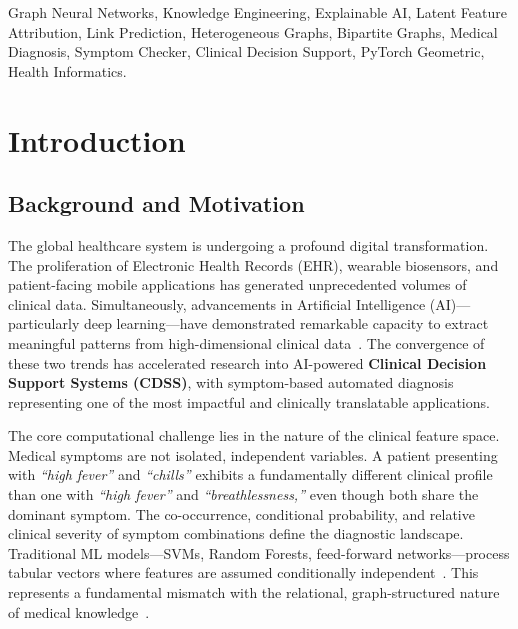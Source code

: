 \documentclass[conference]{IEEEtran}
\begin{document}
\begin{IEEEkeywords}
Graph Neural Networks, Knowledge Engineering, Explainable AI,
Latent Feature Attribution, Link Prediction, Heterogeneous Graphs,
Bipartite Graphs, Medical Diagnosis, Symptom Checker, Clinical Decision
Support, PyTorch Geometric, Health Informatics.
\end{IEEEkeywords}

\section{Introduction}

\subsection{Background and Motivation}

The global healthcare system is undergoing a profound digital
transformation. The proliferation of Electronic Health Records (EHR),
wearable biosensors, and patient-facing mobile applications has
generated unprecedented volumes of clinical data. Simultaneously,
advancements in Artificial Intelligence (AI)---particularly deep
learning---have demonstrated remarkable capacity to extract meaningful
patterns from high-dimensional clinical data~\cite{esteva2021deep,
topol2019high}. The convergence of these two trends has accelerated
research into AI-powered \textbf{Clinical Decision Support Systems
(CDSS)}, with symptom-based automated diagnosis representing one of
the most impactful and clinically translatable applications.

The core computational challenge lies in the nature of the clinical
feature space. Medical symptoms are not isolated, independent
variables. A patient presenting with \textit{``high fever''} and
\textit{``chills''} exhibits a fundamentally different clinical
profile than one with \textit{``high fever''} and
\textit{``breathlessness,''} even though both share the dominant
symptom. The co-occurrence, conditional probability, and relative
clinical severity of symptom combinations define the diagnostic
landscape. Traditional ML models---SVMs, Random Forests, feed-forward
networks---process tabular vectors where features are assumed
conditionally independent~\cite{rajkomar2018deep,chen2018why}. This
represents a fundamental mismatch with the relational, graph-structured
nature of medical knowledge~\cite{obermeyer2019dissecting}.
\end{document}
